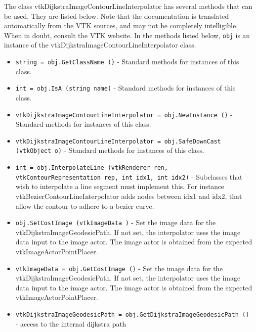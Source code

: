 The class vtkDijkstraImageContourLineInterpolator has several methods that can be used.
  They are listed below.
Note that the documentation is translated automatically from the VTK sources,
and may not be completely intelligible.  When in doubt, consult the VTK website.
In the methods listed below, \verb|obj| is an instance of the vtkDijkstraImageContourLineInterpolator class.
\begin{itemize}
\item  \verb|string = obj.GetClassName ()| -  Standard methods for instances of this class.

\item  \verb|int = obj.IsA (string name)| -  Standard methods for instances of this class.

\item  \verb|vtkDijkstraImageContourLineInterpolator = obj.NewInstance ()| -  Standard methods for instances of this class.

\item  \verb|vtkDijkstraImageContourLineInterpolator = obj.SafeDownCast (vtkObject o)| -  Standard methods for instances of this class.

\item  \verb|int = obj.InterpolateLine (vtkRenderer ren, vtkContourRepresentation rep, int idx1, int idx2)| -  Subclasses that wish to interpolate a line segment must implement this.
 For instance vtkBezierContourLineInterpolator adds nodes between idx1
 and idx2, that allow the contour to adhere to a bezier curve.

\item  \verb|obj.SetCostImage (vtkImageData )| -  Set the image data for the vtkDijkstraImageGeodesicPath.
 If not set, the interpolator uses the image data input to the image actor.
 The image actor is obtained from the expected vtkImageActorPointPlacer.

\item  \verb|vtkImageData = obj.GetCostImage ()| -  Set the image data for the vtkDijkstraImageGeodesicPath.
 If not set, the interpolator uses the image data input to the image actor.
 The image actor is obtained from the expected vtkImageActorPointPlacer.

\item  \verb|vtkDijkstraImageGeodesicPath = obj.GetDijkstraImageGeodesicPath ()| -  access to the internal dijkstra path

\end{itemize}
